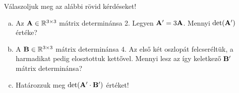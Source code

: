 \documentclass[exercise]{math-standalone}
\begin{document}
\begin{exercise}{Válaszoljuk meg az alábbi rövid kérdéseket!}
  \begin{enumerate}[a)]
    \item Az $\mathbf{A} \in \mathbb R^{3 \times 3}$ mátrix determinánsa 2.
          Legyen $\mathbf{A}' = 3 \mathbf{A}$.
          Mennyi $\det(\mathbf{A}')$ értéke?
    \item A $\mathbf{B} \in \mathbb R^{3 \times 3}$ mátrix determinánsa 4.
          Az első két oszlopát felcseréltük, a harmadikat pedig
          elosztottuk kettővel. Mennyi lesz az így keletkező $\mathbf{B}'$ mátrix
          determinánsa?
    \item Határozzuk meg $\det(\mathbf{A}' \cdot \mathbf{B}')$ értéket!
  \end{enumerate}

\end{exercise}
\end{document}
